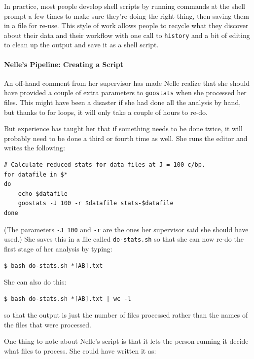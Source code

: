\documentclass{book}
\begin{document}
In practice, most people develop shell scripts by running commands at
the shell prompt a few times to make sure they're doing the right thing,
then saving them in a file for re-use. This style of work allows people
to recycle what they discover about their data and their workflow with
one call to \texttt{history} and a bit of editing to clean up the output
and save it as a shell script.

\mbox{}\paragraph{Nelle's Pipeline: Creating a Script}

An off-hand comment from her supervisor has made Nelle realize that she
should have provided a couple of extra parameters to \texttt{goostats}
when she processed her files. This might have been a disaster if she had
done all the analysis by hand, but thanks to for loops, it will only
take a couple of hours to re-do.

But experience has taught her that if something needs to be done twice,
it will probably need to be done a third or fourth time as well. She
runs the editor and writes the following:

\begin{verbatim}
# Calculate reduced stats for data files at J = 100 c/bp.
for datafile in $*
do
    echo $datafile
    goostats -J 100 -r $datafile stats-$datafile
done
\end{verbatim}

(The parameters \texttt{-J 100} and \texttt{-r} are the ones her
supervisor said she should have used.) She saves this in a file called
\texttt{do-stats.sh} so that she can now re-do the first stage of her
analysis by typing:

\begin{verbatim}
$ bash do-stats.sh *[AB].txt
\end{verbatim}

She can also do this:

\begin{verbatim}
$ bash do-stats.sh *[AB].txt | wc -l
\end{verbatim}

so that the output is just the number of files processed rather than the
names of the files that were processed.

One thing to note about Nelle's script is that it lets the person
running it decide what files to process. She could have written it as:
\end{document}
